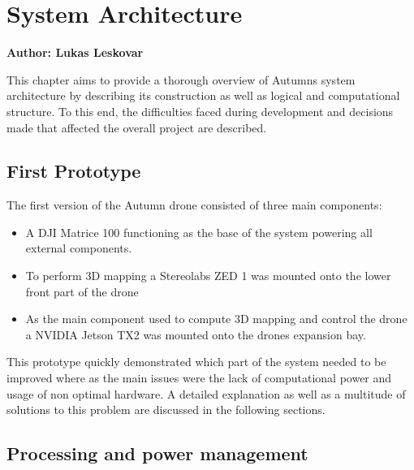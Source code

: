 \chapter{System Architecture}
\label{chapter:architecture}

\textbf{Author: Lukas Leskovar} 

This chapter aims to provide a thorough overview of Autumns system architecture by describing its construction as well as logical and computational  structure. To this end, the difficulties faced during development and decisions made that affected the overall project are described.

\section{First Prototype}
The first version of the Autumn drone consisted of three main components:
\begin{itemize}
	\item A DJI Matrice 100 functioning as the base of the system powering all external components.
	\item To perform 3D mapping a Stereolabs ZED 1 was mounted onto the lower front part of the drone
	\item As the main component used to compute 3D mapping and control the drone a NVIDIA Jetson TX2 was mounted onto the drones expansion bay.
\end{itemize}
This prototype quickly demonstrated which part of the system needed to be improved where as the main issues were the lack of computational power and usage of non optimal hardware. A detailed explanation as well as a multitude of solutions to this problem are discussed in the following sections.


\section{Processing and power management}


